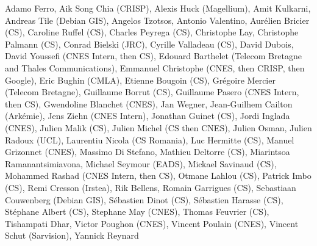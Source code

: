 Adamo Ferro,
Aik Song Chia (CRISP),
Alexis Huck (Magellium),
Amit Kulkarni,
Andreas Tile (Debian GIS),
Angelos Tzotsos,
Antonio Valentino,
Aur\'elien Bricier (CS),
Caroline Ruffel (CS),
Charles Peyrega (CS),
Christophe Lay,
Christophe Palmann (CS),
Conrad Bielski (JRC),
Cyrille Valladeau (CS),
David Dubois,
David Youssefi  (CNES Intern, then CS),
Edouard Barthelet (Telecom Bretagne and Thales Communications),
Emmanuel Christophe (CNES, then CRISP, then Google),
Eric Bughin (CMLA),
Etienne Bougoin (CS),
Gr\'egoire Mercier (Telecom Bretagne),
Guillaume Borrut (CS),
Guillaume Pasero (CNES Intern, then CS),
Gwendoline Blanchet (CNES),
Jan Wegner,
Jean-Guilhem Cailton (Ark\'emie),
Jens Ziehn (CNES Intern),
Jonathan Guinet (CS),
Jordi Inglada (CNES),
Julien Malik (CS),
Julien Michel (CS then CNES),
Julien Osman,
Julien Radoux (UCL),
Laurentiu Nicola (CS Romania),
Luc Hermitte (CS),
Manuel Grizonnet (CNES),
Massimo Di Stefano,
Mathieu Deltorre (CS),
Miarintsoa Ramanantsimiavona,
Michael Seymour (EADS),
Mickael Savinaud (CS),
Mohammed Rashad (CNES Intern, then CS),
Otmane Lahlou (CS),
Patrick Imbo (CS),
Remi Cresson (Irstea),
Rik Bellens,
Romain Garrigues (CS),
Sebastiaan Couwenberg (Debian GIS),
S\'ebastien Dinot (CS),
S\'ebastien Harasse (CS),
St\'ephane Albert (CS),
Stephane May (CNES),
Thomas Feuvrier (CS),
Tishampati Dhar,
Victor Poughon (CNES),
Vincent Poulain (CNES),
Vincent Schut (Sarvision),
Yannick Reynard
